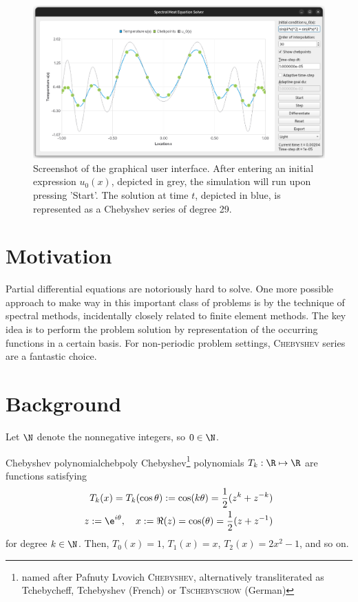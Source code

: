 \documentclass[12pt, a4paper]{article}
\begin{document}
  \begin{figure}[H]
    \centering
    \includegraphics[width=\linewidth]{figures/screenshot.png}
    \caption{Screenshot of the graphical user interface. After entering an initial expression $u_0(x)$, depicted in grey, the simulation will run upon pressing 'Start'. The solution at time $t$, depicted in blue, is represented as a Chebyshev series of degree 29.}
  \end{figure}

  \pagebreak
  \pagestyle{normal}

  \section{Motivation}
  Partial differential equations are notoriously hard to solve. One more possible approach to make way in this important class of problems is by the technique of spectral methods, incidentally closely related to finite element methods.
  The key idea is to perform the problem solution by representation of the occurring functions in a certain basis.
  For non-periodic problem settings, \textsc{Chebyshev} series are a fantastic choice.

  \section{Background}
  Let $\N$ denote the nonnegative integers, so $0 \in \N$.

  \begin{definition}{Chebyshev polynomial}{chebpoly}
    Chebyshev\footnote{named after Pafnuty Lvovich \textsc{Chebyshev}, alternatively transliterated as Tchebycheff, Tchebyshev (French) or \textsc{Tschebyschow} (German)} polynomials $T_k: \R \mapsto \R$ are functions satisfying
    \begin{align*}
      T_k(x) = T_k(\cos \theta) := \cos(k \theta) = \frac{1}{2} (z^k + z^{-k}) \\
      z := \e^{i \theta},\quad x := \Re(z) = \cos(\theta) = \frac{1}{2}(z + z^{-1})
    \end{align*}
    for degree $k \in \N$. Then, $T_0(x) = 1$, $T_1(x) = x$, $T_2(x) = 2x^2-1$, and so on.
  \end{definition}
\end{document}
